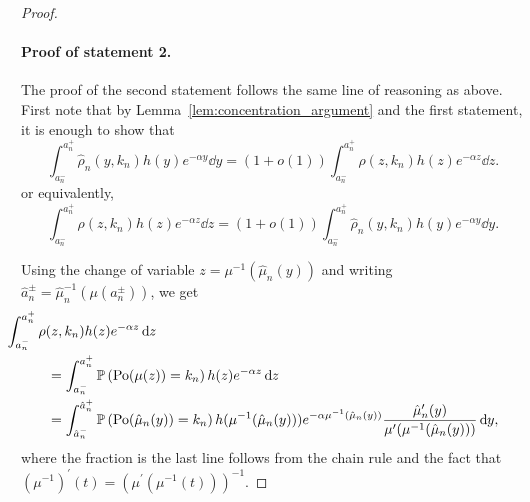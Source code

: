\begin{proof}
\paragraph{Proof of statement 2.}

The proof of the second statement follows the same line of reasoning as above. First note that by Lemma~\ref{lem:concentration_argument} and the first statement, it is enough to show that
\[
	\int_{a_n^-}^{a_n^+} \hat{\rho}_n(y,k_n) h(y) e^{-\alpha y} \dd y
	= \left(1 + o(1)\right) \int_{a_n^-}^{a_n^+} \rho(z,k_n) h(z) e^{-\alpha z} \dd z.
\] 
or equivalently,
\[
	\int_{a_n^-}^{a_n^+} \rho(z,k_n) h(z) e^{-\alpha z} \dd z
	= \left(1 + o(1)\right)\int_{a_n^-}^{a_n^+} \hat{\rho}_n(y,k_n) h(y) e^{-\alpha y} \dd y.
\] 

Using the change of variable $z = \mu^{-1}(\hat{\mu}_n(y))$ and writing $\hat{a}_n^\pm = \hat{\mu}_n^{-1}(\mu(a_n^\pm))$, we get
\begin{align*}
	&\hspace{-30pt}\int_{a_n^-}^{a_n^+} \rho(z,k_n) h(z) e^{-\alpha z} \dd z \\
	&= \int_{a_n^-}^{a_n^+} \Prob{\Po(\mu(z)) = k_n} h(z) e^{-\alpha z} \dd z\\
	&= \int_{\hat{a}_n^-}^{\hat{a}_n^+} \Prob{\Po(\hat{\mu}_n(y)) = k_n} h(\mu^{-1}(\hat{\mu}_n(y))) e^{-\alpha \mu^{-1}(\hat{\mu}_n(y))} 
		\frac{\hat{\mu}_n^\prime(y)}{\mu^\prime(\mu^{-1}(\hat{\mu}_n(y)))} \dd y,
\end{align*}
where the fraction is the last line follows from the chain rule and the fact that $(\mu^{-1})^\prime(t) = (\mu^\prime(\mu^{-1}(t)))^{-1}$.


\end{proof}
